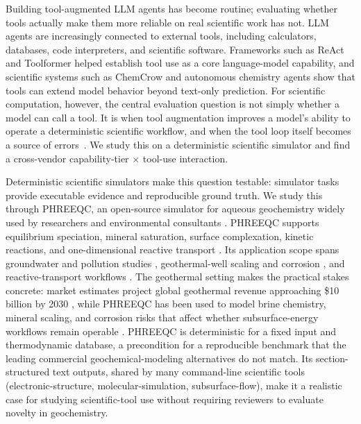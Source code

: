 \documentclass{article}
\begin{document}
Building tool-augmented LLM agents has become routine; evaluating whether tools actually make them more reliable on real scientific work has not. LLM agents are increasingly connected to external tools, including calculators, databases, code interpreters, and scientific software. Frameworks such as ReAct \citep{yao2023react} and Toolformer \citep{schick2023toolformer} helped establish tool use as a core language-model capability, and scientific systems such as ChemCrow \citep{bran2024chemcrow} and autonomous chemistry agents \citep{boiko2023autonomous} show that tools can extend model behavior beyond text-only prediction. For scientific computation, however, the central evaluation question is not simply whether a model can call a tool. It is when tool augmentation improves a model's ability to operate a deterministic scientific workflow, and when the tool loop itself becomes a source of errors~\citep{toolusetax2026}. We study this on a deterministic scientific simulator and find a cross-vendor capability-tier $\times$ tool-use interaction.

Deterministic scientific simulators make this question testable: simulator tasks provide executable evidence and reproducible ground truth. We study this through PHREEQC, an open-source simulator for aqueous geochemistry widely used by researchers and environmental consultants \citep{parkhurst2013phreeqc}. PHREEQC supports equilibrium speciation, mineral saturation, surface complexation, kinetic reactions, and one-dimensional reactive transport \citep{parkhurst2013phreeqc}. Its application scope spans groundwater and pollution studies \citep{appelo2004geochemistry}, geothermal-well scaling and corrosion \citep{bozau2015hydrogeochemical}, and reactive-transport workflows \citep{parkhurst2013phreeqc}. The geothermal setting makes the practical stakes concrete: market estimates project global geothermal revenue approaching \$10 billion by 2030 \citep{grandview2024geothermalmarket}, while PHREEQC has been used to model brine chemistry, mineral scaling, and corrosion risks that affect whether subsurface-energy workflows remain operable \citep{bozau2015hydrogeochemical}. PHREEQC is deterministic for a fixed input and thermodynamic database, a precondition for a reproducible benchmark that the leading commercial geochemical-modeling alternatives do not match. Its section-structured text outputs, shared by many command-line scientific tools (electronic-structure, molecular-simulation, subsurface-flow), make it a realistic case for studying scientific-tool use without requiring reviewers to evaluate novelty in geochemistry.
\end{document}
